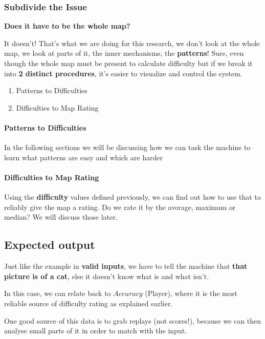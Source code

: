\documentclass{article}
\begin{document}
\subsubsection{Subdivide the Issue}

\textbf{Does it have to be the whole map?}

It doesn't! That's what we are doing for this research, we don't look at the whole map, we look at parts of it, the inner mechanisms, the \textbf{patterns}! Sure, even though the whole map must be present to calculate difficulty but if we break it into \textbf{2 distinct procedures}, it's easier to visualize and control the system.

\begin{enumerate}
	\item Patterns to Difficulties
	\item Difficulties to Map Rating
\end{enumerate}

\paragraph{Patterns to Difficulties} In the following sections we will be discussing how we can task the machine to learn what patterns are easy and which are harder

\paragraph{Difficulties to Map Rating} Using the \textbf{difficulty} values defined previously, we can find out how to use that to reliably give the map a rating. Do we rate it by the average, maximum or median? We will discuss those later.

\subsection{Expected output}

Just like the example in \textbf{valid inputs}, we have to tell the machine that \textbf{that picture is of a cat}, else it doesn't know what is and what isn't.

In this case, we can relate back to $Accuracy$ (Player), where it is the most reliable source of difficulty rating as explained earlier.

One good source of this data is to grab replays (not scores!), because we can then analyse small parts of it in order to match with the input. 
\end{document}
